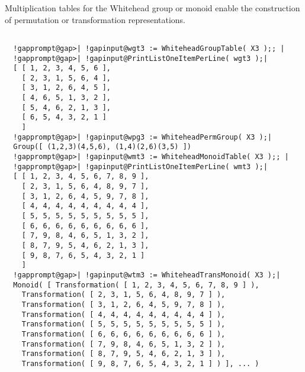 \documentclass[a4paper,11pt]{report}
\begin{document}
{{{ Multiplication tables for the Whitehead group or monoid enable the
construction of permutation or transformation representations. }

 
\begin{Verbatim}[commandchars=!@|,fontsize=\small,frame=single,label=Example]
  
  !gapprompt@gap>| !gapinput@wgt3 := WhiteheadGroupTable( X3 );; |
  !gapprompt@gap>| !gapinput@PrintListOneItemPerLine( wgt3 );|
  [ [ 1, 2, 3, 4, 5, 6 ],
    [ 2, 3, 1, 5, 6, 4 ],
    [ 3, 1, 2, 6, 4, 5 ],
    [ 4, 6, 5, 1, 3, 2 ],
    [ 5, 4, 6, 2, 1, 3 ],
    [ 6, 5, 4, 3, 2, 1 ]
    ]
  !gapprompt@gap>| !gapinput@wpg3 := WhiteheadPermGroup( X3 );|
  Group([ (1,2,3)(4,5,6), (1,4)(2,6)(3,5) ])
  !gapprompt@gap>| !gapinput@wmt3 := WhiteheadMonoidTable( X3 );; |
  !gapprompt@gap>| !gapinput@PrintListOneItemPerLine( wmt3 );|
  [ [ 1, 2, 3, 4, 5, 6, 7, 8, 9 ],
    [ 2, 3, 1, 5, 6, 4, 8, 9, 7 ],
    [ 3, 1, 2, 6, 4, 5, 9, 7, 8 ],
    [ 4, 4, 4, 4, 4, 4, 4, 4, 4 ],
    [ 5, 5, 5, 5, 5, 5, 5, 5, 5 ],
    [ 6, 6, 6, 6, 6, 6, 6, 6, 6 ],
    [ 7, 9, 8, 4, 6, 5, 1, 3, 2 ],
    [ 8, 7, 9, 5, 4, 6, 2, 1, 3 ],
    [ 9, 8, 7, 6, 5, 4, 3, 2, 1 ]
    ]
  !gapprompt@gap>| !gapinput@wtm3 := WhiteheadTransMonoid( X3 );|
  Monoid( [ Transformation( [ 1, 2, 3, 4, 5, 6, 7, 8, 9 ] ),
    Transformation( [ 2, 3, 1, 5, 6, 4, 8, 9, 7 ] ),
    Transformation( [ 3, 1, 2, 6, 4, 5, 9, 7, 8 ] ),
    Transformation( [ 4, 4, 4, 4, 4, 4, 4, 4, 4 ] ),
    Transformation( [ 5, 5, 5, 5, 5, 5, 5, 5, 5 ] ),
    Transformation( [ 6, 6, 6, 6, 6, 6, 6, 6, 6 ] ),
    Transformation( [ 7, 9, 8, 4, 6, 5, 1, 3, 2 ] ),
    Transformation( [ 8, 7, 9, 5, 4, 6, 2, 1, 3 ] ),
    Transformation( [ 9, 8, 7, 6, 5, 4, 3, 2, 1 ] ) ], ... )
  
\end{Verbatim}
 }

 }

            
\end{document}
